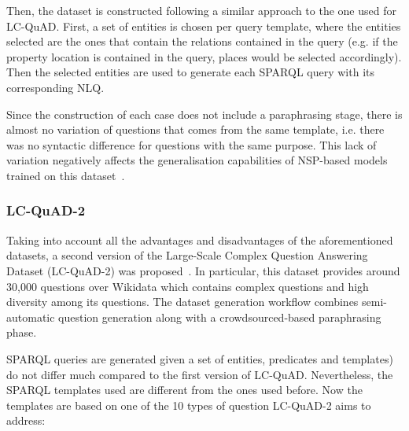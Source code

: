 Then, the dataset is constructed following a similar approach to the one used for LC-QuAD. 
First, a set of entities is chosen per query template, where the entities selected are the ones 
that contain the relations contained in the query (e.g. if the property location is contained 
in the query, places would be selected accordingly). Then the selected entities are used to 
generate each SPARQL query with its corresponding NLQ. 

Since the construction of each case does not include a paraphrasing stage, there is almost no 
variation of questions that comes from the same template, i.e. there was no syntactic 
difference for questions with the same purpose. This lack of variation negatively affects the 
generalisation capabilities of NSP-based models trained on this dataset~\cite{qa:BerantL14}.

\subsubsection{LC-QuAD-2}
\label{cap2:qakg/benchmarkDatasets/lcquad2}
Taking into account all the advantages and disadvantages of the aforementioned datasets, a 
second version of the Large-Scale Complex Question Answering Dataset (LC-QuAD-2) was 
proposed~\cite{dataset:lcquad2-DubeyBA019}. In particular, this dataset provides around 30,000 
questions over Wikidata which contains complex questions and high diversity among its questions. 
The dataset generation workflow combines semi-automatic question generation along with a 
crowdsourced-based paraphrasing phase.

SPARQL queries are generated given a set of entities, predicates and templates) do not differ 
much compared to the first version of LC-QuAD. Nevertheless, the SPARQL templates used are 
different from the ones used before. Now the templates are based on one of the 10 types of 
question LC-QuAD-2 aims to address:

